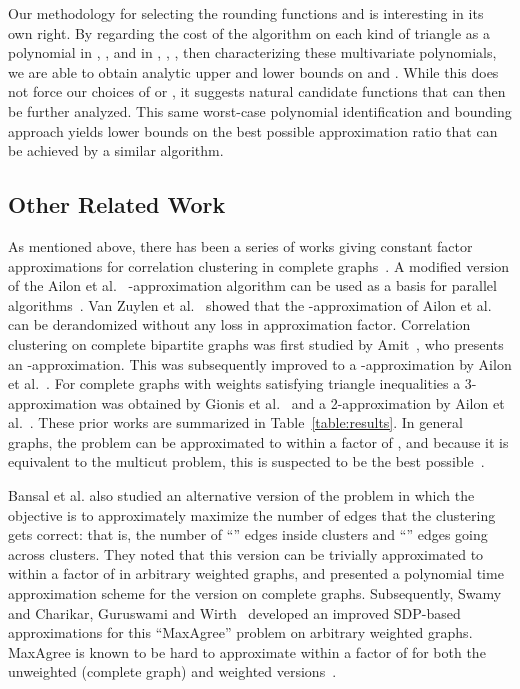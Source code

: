 \documentclass[11pt]{article}
\theoremstyle{definition}
\theoremstyle{remark}
\begin{document}
Our methodology for selecting the rounding functions  and  is interesting in its
own right. By regarding the cost of the algorithm on each kind of triangle as a
polynomial in , ,  and in , ,
,  then characterizing these multivariate polynomials, we are able to
obtain analytic upper and lower bounds on  and . While
this does not force our choices of  or , it suggests natural candidate functions
that can then be further analyzed. This same worst-case polynomial
identification and bounding approach yields lower bounds on the best possible
approximation ratio that can be achieved by a similar algorithm.

\subsection{Other Related Work}

As mentioned above, there has been a series of works giving constant
factor approximations for correlation clustering in complete
graphs~\cite{BBC04, CGW05, ACN08}.  A modified version of the Ailon et
al.~\cite{ACN08} -approximation algorithm can be used as a basis for parallel
algorithms~\cite{CDK14}. Van Zuylen et al.~\cite{ZHJW07} showed that the
-approximation of Ailon et al. can be derandomized without any loss in
approximation factor. Correlation clustering on complete bipartite graphs was
first studied by Amit~\cite{A04}, who presents an -approximation. This was
subsequently improved to a -approximation by Ailon et al.~\cite{AALZ12}.
For complete graphs with weights satisfying triangle inequalities a
3-approximation was obtained by Gionis et al.~\cite{GMT07} and a
2-approximation by Ailon et al.~\cite{ACN08}. These prior works are summarized
in Table~\ref{table:results}.  In general graphs, the problem can be
approximated to within a factor of , and because it is equivalent to
the multicut problem, this is suspected to be the best possible~\cite{CGW05,
DEFI06}.

Bansal et al. \cite{BBC04} also studied an alternative version of the problem
in which the objective is to approximately maximize the number of edges that
the clustering gets correct: that is, the number of ``'' edges inside
clusters and ``'' edges going across clusters. They noted that this version
can be trivially approximated to within a factor of  in arbitrary weighted
graphs, and presented a polynomial time approximation scheme for the version on
complete graphs. Subsequently, Swamy~\cite{Swamy04} and Charikar, Guruswami and
Wirth~\cite{CGW05} developed an improved SDP-based approximations for this
``MaxAgree'' problem on arbitrary weighted graphs. MaxAgree is known to be hard
to approximate within a factor of  for both the unweighted (complete
graph) and weighted versions~\cite{CGW05, Tan08}.
\end{document}

